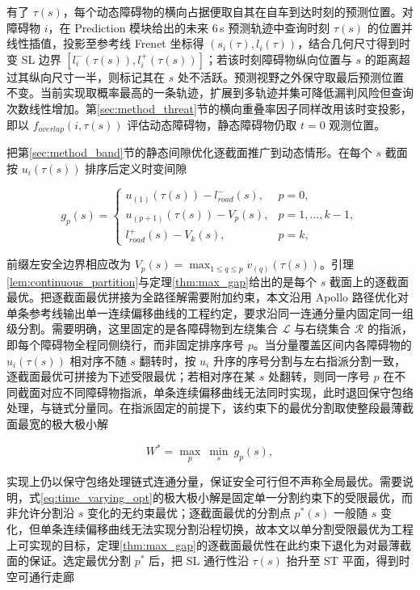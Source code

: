\documentclass[a4paper,11pt]{ctexart}
\theoremstyle{definition}
\begin{document}
有了 $\tau(s)$，每个动态障碍物的横向占据便取自其在自车到达时刻的预测位置。对障碍物 $i$，在 Prediction 模块给出的未来 $6$\,s 预测轨迹中查询时刻 $\tau(s)$ 的位置并线性插值，投影至参考线 Frenet 坐标得 $(s_i(\tau), l_i(\tau))$，结合几何尺寸得到时变 SL 边界 $[l_i^{-}(\tau(s)), l_i^{+}(\tau(s))]$；若该时刻障碍物纵向位置与 $s$ 的距离超过其纵向尺寸一半，则标记其在 $s$ 处不活跃。预测视野之外保守取最后预测位置不变。当前实现取概率最高的一条轨迹，扩展到多轨迹并集可降低漏判风险但查询次数线性增加。第\ref{sec:method_threat}节的横向重叠率因子同样改用该时变投影，即以 $f_{overlap}(i, \tau(s))$ 评估动态障碍物，静态障碍物仍取 $t=0$ 观测位置。

把第\ref{sec:method_band}节的静态间隙优化逐截面推广到动态情形。在每个 $s$ 截面按 $u_i(\tau(s))$ 排序后定义时变间隙

\begin{equation}
    g_p(s) =
    \begin{cases}
        u_{(1)}(\tau(s)) - l_{road}^{-}(s), & p=0, \\[0.3em]
        u_{(p+1)}(\tau(s)) - V_p(s), & p=1,\ldots,k-1, \\[0.3em]
        l_{road}^{+}(s) - V_k(s), & p=k,
    \end{cases}
    \label{eq:time_varying_gap}
\end{equation}

前缀左安全边界相应改为 $V_p(s)=\max_{1\leq q\leq p} v_{(q)}(\tau(s))$。引理\ref{lem:continuous_partition}与定理\ref{thm:max_gap}给出的是每个 $s$ 截面上的逐截面最优。把逐截面最优拼接为全路径解需要附加约束，本文沿用 Apollo 路径优化对单条参考线输出单一连续偏移曲线的工程约定，要求沿同一连通分量内固定同一组级分割。需要明确，这里固定的是各障碍物到左绕集合 $\mathcal{L}$ 与右绕集合 $\mathcal{R}$ 的指派，即每个障碍物全程同侧绕行，而非固定排序序号 $p$。当分量覆盖区间内各障碍物的 $u_i(\tau(s))$ 相对序不随 $s$ 翻转时，按 $u_i$ 升序的序号分割与左右指派分割一致，逐截面最优可拼接为下述受限最优；若相对序在某 $s$ 处翻转，则同一序号 $p$ 在不同截面对应不同障碍物指派，单条连续偏移曲线无法同时实现，此时退回保守包络处理，与链式分量同。在指派固定的前提下，该约束下的最优分割取使整段最薄截面最宽的极大极小解

\begin{equation}
    W^{*} = \max_{p}\ \min_{s}\ g_p(s),
    \label{eq:time_varying_opt}
\end{equation}

实现上仍以保守包络处理链式连通分量，保证安全可行但不声称全局最优。需要说明，式\eqref{eq:time_varying_opt}的极大极小解是固定单一分割约束下的受限最优，而非允许分割沿 $s$ 变化的无约束最优；逐截面最优的分割点 $p^{*}(s)$ 一般随 $s$ 变化，但单条连续偏移曲线无法实现分割沿程切换，故本文以单分割受限最优为工程上可实现的目标，定理\ref{thm:max_gap}的逐截面最优性在此约束下退化为对最薄截面的保证。选定最优分割 $p^{*}$ 后，把 SL 通行性沿 $\tau(s)$ 抬升至 ST 平面，得到时空可通行走廊
\end{document}
